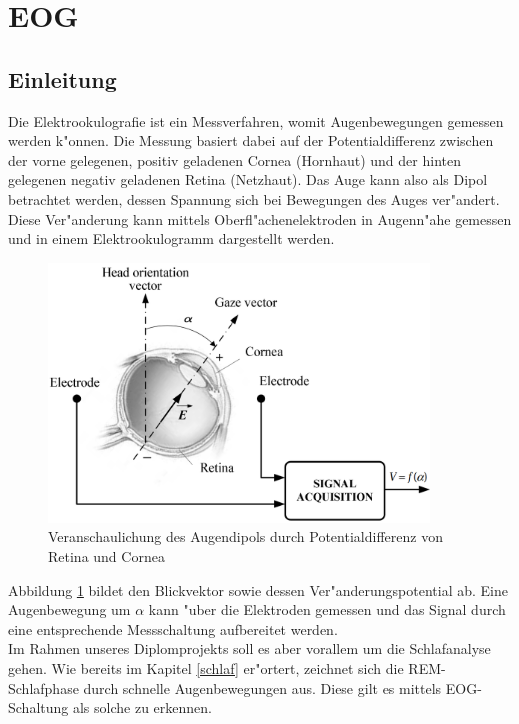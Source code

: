 
\section {EOG} \label {eog}

\subsection {Einleitung} \label {eog einleitung}

Die Elektrookulografie ist ein Messverfahren, womit Augenbewegungen gemessen werden k"onnen. Die Messung basiert dabei auf der Potentialdifferenz zwischen der vorne gelegenen, positiv geladenen Cornea (Hornhaut) und der hinten gelegenen negativ geladenen Retina (Netzhaut). Das Auge kann also als Dipol betrachtet werden, dessen Spannung sich bei Bewegungen des Auges ver"andert. Diese Ver"anderung kann mittels Oberfl"achenelektroden in Augenn"ahe gemessen und in einem Elektrookulogramm dargestellt werden. \cite{reg205}

\begin{figure}[h]
	\centering
		\includegraphics[width=0.9\textwidth]{Fuchs/Augendipol.png}
	\caption{Veranschaulichung des Augendipols durch Potentialdifferenz von Retina und Cornea}
	\label{fig:Augendipol}
\end{figure}

Abbildung \ref{fig:Augendipol} bildet den Blickvektor sowie dessen Ver"anderungspotential ab.  Eine Augenbewegung um $\alpha$ kann "uber die Elektroden gemessen und das Signal durch eine entsprechende Messschaltung aufbereitet werden. \cite{reg205}\\
Im Rahmen unseres Diplomprojekts soll es aber vorallem um die Schlafanalyse gehen. Wie bereits im Kapitel \ref{schlaf} er"ortert, zeichnet sich die REM-Schlafphase durch schnelle Augenbewegungen aus. Diese gilt es mittels EOG-Schaltung als solche zu erkennen. 

